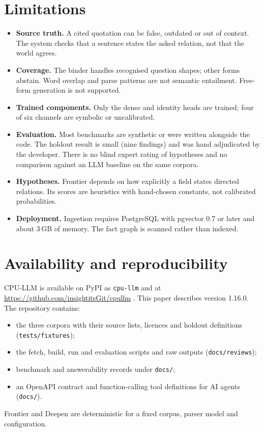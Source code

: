 \documentclass[11pt]{article}
\begin{document}
\section{Limitations}
\label{sec:limits}

\begin{itemize}
  \item \textbf{Source truth.} A cited quotation can be false, outdated or out of context. The system checks that
        a sentence states the asked relation, not that the world agrees.
  \item \textbf{Coverage.} The binder handles recognised question shapes; other forms abstain. Word overlap and
        parse patterns are not semantic entailment. Free-form generation is not supported.
  \item \textbf{Trained components.} Only the dense and identity heads are trained; four of six channels are
        symbolic or uncalibrated.
  \item \textbf{Evaluation.} Most benchmarks are synthetic or were written alongside the code. The holdout result
        is small (nine findings) and was hand adjudicated by the developer. There is no blind expert rating of
        hypotheses and no comparison against an LLM baseline on the same corpora.
  \item \textbf{Hypotheses.} Frontier depends on how explicitly a field states directed relations. Its scores
        are heuristics with hand-chosen constants, not calibrated probabilities.
  \item \textbf{Deployment.} Ingestion requires PostgreSQL with pgvector 0.7 or later and about 3\,GB of memory.
        The fact graph is scanned rather than indexed.
\end{itemize}

\section{Availability and reproducibility}

CPU-LLM is available on PyPI as \texttt{cpu-llm} and at \url{https://github.com/insightitsGit/cpullm}
\cite{cpullm2026}. This paper describes version 1.16.0. The repository contains:
\begin{itemize}
  \item the three corpora with their source lists, licences and holdout definitions (\texttt{tests/fixtures});
  \item the fetch, build, run and evaluation scripts and raw outputs (\texttt{docs/reviews});
  \item benchmark and answerability records under \texttt{docs/};
  \item an OpenAPI contract and function-calling tool definitions for AI agents (\texttt{docs/}).
\end{itemize}
Frontier and Deepen are deterministic for a fixed corpus, parser model and configuration.
\end{document}
